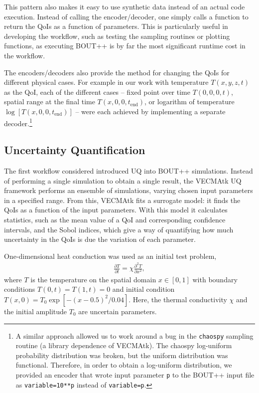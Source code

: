 This pattern also makes it easy to use synthetic data instead of an actual
code execution.
Instead of calling the encoder/decoder, one simply calls a function to return
the QoIs as a function of parameters.
This is particularly useful in developing the workflow, such as testing the
sampling routines or plotting functions, as executing BOUT++ is by far the
most significant runtime cost in the workflow. 

The encoders/decoders also provide the method for changing the QoIs for
different physical cases.
For example in our work with temperature $T(x,y,z,t)$ as the QoI,
each of the different cases -- fixed point over time $T(0,0,0,t)$,
spatial range at the final time $T(x,0,0,t_{\mathrm{end}})$,
or logarithm of temperature $\log[T(x,0,0,t_{\mathrm{end}})]$ --
were each achieved by implementing a separate decoder.\footnote{A similar
approach allowed us to work around a bug in the \texttt{chaospy} sampling routine
(a library dependence of VECMAtk).
The chaospy log-uniform probability distribution was broken, but the uniform
distribution was functional.
Therefore, in order to obtain a log-uniform distribution, we provided an encoder that wrote input parameter \texttt{p}
to the BOUT++ input file as \texttt{variable=10**p} instead of \texttt{variable=p}.}

\subsection{Uncertainty Quantification}\label{sec:uqsurrogate}

The first workflow considered introduced UQ into BOUT++ simulations.
Instead of performing a single simulation to obtain a single result, the
VECMAtk UQ framework performs an ensemble of simulations, varying chosen
input parameters in a specified range.
From this, VECMAtk fits a surrogate model: it finds the QoIs as a function of
the input parameters.
With this model it calculates statistics, such as the mean value of a QoI and
corresponding confidence intervals, and the Sobol indices, which give a way
of quantifying how much uncertainty in the QoIs is due the variation of each
parameter.

One-dimensional heat conduction was used as an initial test problem,
\begin{align}
\frac{\partial T}{\partial t} = \chi \frac{\partial^2T}{\partial x^2},
\label{eq:heat_conduction}
\end{align}
where $T$ is the temperature on the spatial domain $x\in[0,1]$
with boundary conditions $T(0,t)=T(1,t)=0$ and initial condition 
$T(x,0) = T_0\exp[-(x-0.5)^2/0.04]$.
Here, the thermal conductivity $\chi$ and the initial amplitude $T_0$ are uncertain parameters. 

